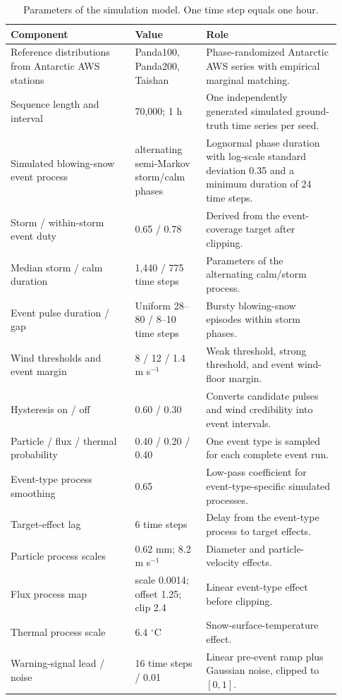 \begin{table}[htbp]
  \centering
  \caption{Parameters of the simulation model. One time step
  equals one hour.}
  \label{tab:simulator_event_parameters}
  \scriptsize
  \renewcommand{\arraystretch}{0.92}
  \setlength{\tabcolsep}{3pt}
  \begin{tabular}{@{}p{0.35\linewidth}p{0.20\linewidth}p{0.38\linewidth}@{}}
    \toprule
    Component & Value & Role \\
    \midrule
    Reference distributions from Antarctic AWS stations
      & Panda100, Panda200, Taishan
      & Phase-randomized Antarctic AWS series with empirical marginal matching. \\
    Sequence length and interval
      & 70,000; 1 h
      & One independently generated simulated ground-truth time series per seed. \\
    Simulated blowing-snow event process
      & alternating semi-Markov storm/calm phases
      & Lognormal phase duration with log-scale standard deviation 0.35 and a
        minimum duration of 24 time steps. \\
    Storm / within-storm event duty
      & 0.65 / 0.78
      & Derived from the event-coverage target after clipping. \\
    Median storm / calm duration
      & 1,440 / 775 time steps
      & Parameters of the alternating calm/storm process. \\
    Event pulse duration / gap
      & Uniform 28--80 / 8--10 time steps
      & Bursty blowing-snow episodes within storm phases. \\
    Wind thresholds and event margin
      & 8 / 12 / 1.4 m s$^{-1}$
      & Weak threshold, strong threshold, and event wind-floor margin. \\
    Hysteresis on / off
      & 0.60 / 0.30
      & Converts candidate pulses and wind credibility into event intervals. \\
    Particle / flux / thermal probability
      & 0.40 / 0.20 / 0.40
      & One event type is sampled for each complete event run. \\
    Event-type process smoothing
      & 0.65
      & Low-pass coefficient for event-type-specific simulated processes. \\
    Target-effect lag
      & 6 time steps
      & Delay from the event-type process to target effects. \\
    Particle process scales
      & 0.62 mm; 8.2 m s$^{-1}$
      & Diameter and particle-velocity effects. \\
    Flux process map
      & scale 0.0014; offset 1.25; clip 2.4
      & Linear event-type effect before clipping. \\
    Thermal process scale
      & 6.4 $^{\circ}$C
      & Snow-surface-temperature effect. \\
    Warning-signal lead / noise
      & 16 time steps / 0.01
      & Linear pre-event ramp plus Gaussian noise, clipped to $[0,1]$. \\
    \bottomrule
  \end{tabular}
\end{table}
